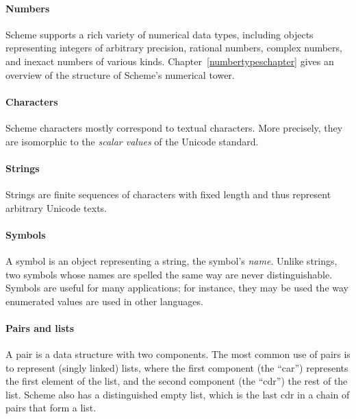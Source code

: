 \paragraph{Numbers}

Scheme supports a rich variety of numerical data types, including
objects representing integers of arbitrary precision, rational numbers, complex numbers, and
inexact numbers of various kinds.  Chapter~\ref{numbertypeschapter} gives an
overview of the structure of Scheme's numerical tower.

\paragraph{Characters}

Scheme characters mostly correspond to textual characters.
More precisely, they are isomorphic to the \textit{scalar values} of
the Unicode standard.

\paragraph{Strings}

Strings are finite sequences of characters with fixed length and thus
represent arbitrary Unicode texts.

\paragraph{Symbols}

A symbol is an object representing a string,
the symbol's \textit{name}.
Unlike strings, two symbols whose names are spelled the same
way are never distinguishable.  Symbols are useful for many applications;
for instance, they may be used the way enumerated values are used in
other languages.

\paragraph{Pairs and lists}

A pair is a data structure with two components.  The most common use
of pairs is to represent (singly linked) lists, where the first
component (the ``car'') represents the first element of the list, and
the second component (the ``cdr'') the rest of the list.  Scheme also
has a distinguished empty list, which is the last cdr in a chain of
pairs that form a list.


